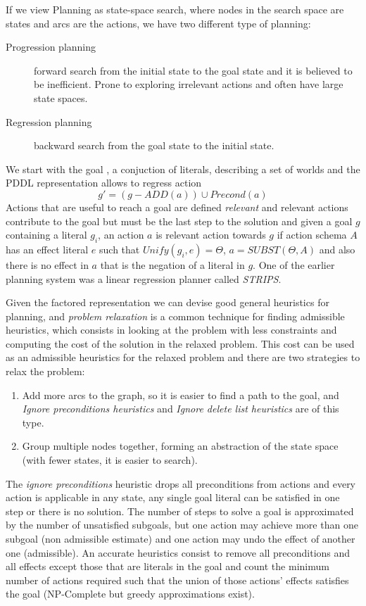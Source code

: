 If we view Planning as state-space search, where nodes in the search space are states and arcs
are the actions, we have two different type of planning:
\begin{description}
    \item [Progression planning] forward search from the initial state to the goal state and it
	    is believed to be inefficient.\newline
		Prone to exploring irrelevant actions and often have large state spaces.
    \item [Regression planning ] backward search from the goal state to the initial state.
\end{description}
We start with the goal , a conjuction of literals, describing a set of worlds and the PDDL 
representation allows to regress action 
\[ g' = (g - ADD(a)) \cup Precond(a) \]
Actions that are useful to reach a goal are defined \emph{relevant} and relevant actions 
contribute to the goal but must be the last step to the solution  and given a goal $g$ containing
a literal $g_i$, an action $a$ is relevant action towards $g$ if action schema $A$ has an effect
literal $e$ such that $Unify(g_i, e) = \Theta$, $a = SUBST(\Theta, A)$ and also there is no
effect in $a$ that is the negation of a literal in $g$.\newline
One of the earlier planning system was a linear regression planner called \emph{STRIPS}.

Given the factored representation we can devise good general heuristics for planning, and 
\emph{problem relaxation} is a common technique for finding admissible heuristics, which consists
in looking at the problem with less constraints and computing the cost of the solution
in the relaxed problem.\newline
This cost can be used as an admissible heuristics for the relaxed problem and there are 
two strategies to relax the problem:
\begin{enumerate}
   \item Add more arcs to the graph, so it is easier to find a path to the goal, and 
	 \emph{Ignore preconditions heuristics} and \emph{Ignore delete list heuristics} are 
	 of this type.
   \item Group multiple nodes together, forming an abstraction of the state space 
	 (with fewer states, it is easier to search).
\end{enumerate}
The \emph{ignore preconditions} heuristic drops all preconditions from actions and every action
is applicable in any state, any single goal literal can be satisfied in one step or there 
is no solution.\newline 
The number of steps to solve a goal is approximated by the number of unsatisfied subgoals, 
but one action may achieve more than one subgoal (non admissible estimate) and one action
may undo the effect of another one (admissible).\newline
An accurate heuristics consist to remove all preconditions and all effects except those that
are literals in the goal and count the minimum number of actions required such that the 
union of those actions' effects satisfies the goal (NP-Complete but greedy approximations exist).

